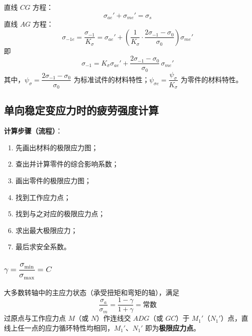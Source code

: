\begin{theorem}[零件极限应力图的直线方程]
\label{thm:极限应力图直线方程}
直线 $CG$ 方程：
\begin{equation}
	\sigma_{ae}'+\sigma_{me}'=\sigma_s
	\label{eq:强度:零件CG直线}
\end{equation}
直线 $AG$ 方程：
\begin{equation}
	\sigma_{-1e}=\frac{\sigma_{-1}}{K_\sigma}=\sigma_{ae}'+\left(\frac{1}{K_\sigma}\cdot\frac{2\sigma_{-1}-\sigma_0}{\sigma_0}\right)\sigma_{me}'
	\label{eq:强度:零件AG直线}
\end{equation}
即
\begin{equation}
	\sigma_{-1}=K_\sigma\sigma_{ae}'+\frac{2\sigma_{-1}-\sigma_0}{\sigma_0}\,\sigma_{me}'
	\label{eq:强度:材料AG直线}
\end{equation}
其中，$\psi_\sigma=\dfrac{2\sigma_{-1}-\sigma_0}{\sigma_0}$ 为标准试件的材料特性；$\psi_{\sigma e}=\dfrac{\psi_\sigma}{K_\sigma}$ 为零件的材料特性。
\end{theorem}

\subsection{单向稳定变应力时的疲劳强度计算}

\textbf{计算步骤（流程）}：
\begin{enumerate}
	\item 先画出材料的极限应力图；
	\item 查出并计算零件的综合影响系数；
	\item 画出零件的极限应力图；
	\item 找到工作应力点；
	\item 找到与之对应的极限应力点；
	\item 求出最大极限应力；
	\item 最后求安全系数。
\end{enumerate}

\subsubsection{$\gamma = \dfrac{\sigma_{\min}}{\sigma_{\max}} = C$}

大多数转轴中的主应力状态（承受扭矩和弯矩的轴），满足
\begin{equation}
	\frac{\sigma_a}{\sigma_m}=\frac{1-\gamma}{1+\gamma}=\text{常数}
	\label{eq:强度:gamma等于C}
\end{equation}
过原点与工作应力点 $M$（或 $N$）作连线交 $ADG$（或 $GC$）于 $M_1'$（$N_1'$）点，直线上任一点的应力循环特性均相同，$M_1'$、$N_1'$ 即为\textbf{极限应力点}。

